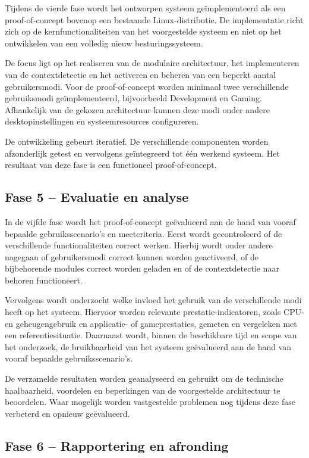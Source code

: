 \documentclass{hogent-article}
\begin{document}
Tijdens de vierde fase wordt het ontworpen systeem geïmplementeerd als een proof-of-concept bovenop een bestaande Linux-distributie. De implementatie richt zich op de kernfunctionaliteiten van het voorgestelde systeem en niet op het ontwikkelen van een volledig nieuw besturingssysteem.

De focus ligt op het realiseren van de modulaire architectuur, het implementeren van de contextdetectie en het activeren en beheren van een beperkt aantal gebruikersmodi. Voor de proof-of-concept worden minimaal twee verschillende gebruiksmodi geïmplementeerd, bijvoorbeeld Development en Gaming. Afhankelijk van de gekozen architectuur kunnen deze modi onder andere desktopinstellingen en systeemresources configureren.

De ontwikkeling gebeurt iteratief. De verschillende componenten worden afzonderlijk getest en vervolgens geïntegreerd tot één werkend systeem. Het resultaat van deze fase is een functioneel proof-of-concept.

\subsection{Fase 5 – Evaluatie en analyse}
\label{ssec:fase5}

In de vijfde fase wordt het proof-of-concept geëvalueerd aan de hand van vooraf bepaalde gebruiksscenario's en meetcriteria. Eerst wordt gecontroleerd of de verschillende functionaliteiten correct werken. Hierbij wordt onder andere nagegaan of gebruikersmodi correct kunnen worden geactiveerd, of de bijbehorende modules correct worden geladen en of de contextdetectie naar behoren functioneert.

Vervolgens wordt onderzocht welke invloed het gebruik van de verschillende modi heeft op het systeem. Hiervoor worden relevante prestatie-indicatoren, zoals CPU- en geheugengebruik en applicatie- of gameprestaties, gemeten en vergeleken met een referentiesituatie. Daarnaast wordt, binnen de beschikbare tijd en scope van het onderzoek, de bruikbaarheid van het systeem geëvalueerd aan de hand van vooraf bepaalde gebruiksscenario's.

De verzamelde resultaten worden geanalyseerd en gebruikt om de technische haalbaarheid, voordelen en beperkingen van de voorgestelde architectuur te beoordelen. Waar mogelijk worden vastgestelde problemen nog tijdens deze fase verbeterd en opnieuw geëvalueerd.

\subsection{Fase 6 – Rapportering en afronding}
\label{ssec:fase6}
\end{document}
